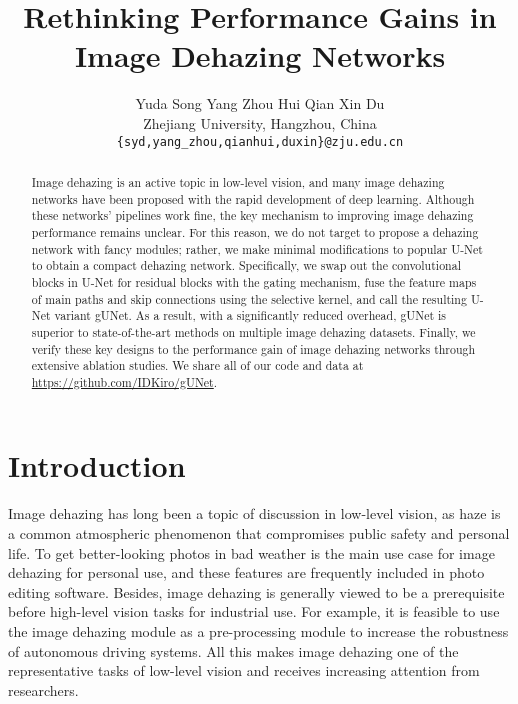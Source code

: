 \documentclass[10pt,twocolumn,letterpaper]{article}
\begin{document}
\title{Rethinking Performance Gains in Image Dehazing Networks}



\author {
	Yuda Song{\footnotemark[2]}
	\quad Yang Zhou{\footnotemark[2]}
	\quad Hui Qian
	\quad Xin Du{\textsuperscript \Letter}\\
	Zhejiang University, Hangzhou, China \\
	{\tt\small \{syd,yang\_zhou,qianhui,duxin\}@zju.edu.cn}
}

\maketitle

\renewcommand{\thefootnote}{\fnsymbol{footnote}}
\renewcommand{\thefootnote}{\arabic{footnote}}

\begin{abstract}
    Image dehazing is an active topic in low-level vision, and many image dehazing networks have been proposed with the rapid development of deep learning.
    Although these networks' pipelines work fine, the key mechanism to improving image dehazing performance remains unclear.
    For this reason, we do not target to propose a dehazing network with fancy modules; rather, we make minimal modifications to popular U-Net to obtain a compact dehazing network.
    Specifically, we swap out the convolutional blocks in U-Net for residual blocks with the gating mechanism, fuse the feature maps of main paths and skip connections using the selective kernel, and call the resulting U-Net variant gUNet.
    As a result, with a significantly reduced overhead, gUNet is superior to state-of-the-art methods on multiple image dehazing datasets.
    Finally, we verify these key designs to the performance gain of image dehazing networks through extensive ablation studies.
    We share all of our code and data
    at \href{https://github.com/IDKiro/gUNet}{https://github.com/IDKiro/gUNet}.
    \vspace{-0.5em}
\end{abstract}
 
\section{Introduction}

Image dehazing has long been a topic of discussion in low-level vision, as haze is a common atmospheric phenomenon that compromises public safety and personal life.
To get better-looking photos in bad weather is the main use case for image dehazing for personal use, and these features are frequently included in photo editing software.
Besides, image dehazing is generally viewed to be a prerequisite before high-level vision tasks for industrial use.
For example, it is feasible to use the image dehazing module as a pre-processing module to increase the robustness of autonomous driving systems.
All this makes image dehazing one of the representative tasks of low-level vision and receives increasing attention from researchers.
\end{document}
